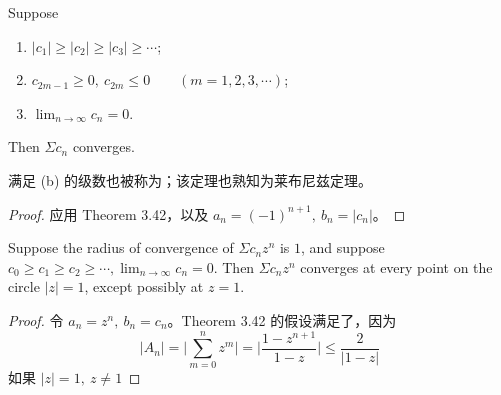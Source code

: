 \documentclass[../poma-notes.tex]{subfiles}
\begin{document}
\begin{theorem}
  Suppose
  \begin{enumerate}[label=(\alph*)]
    \item $|c_1| \ge |c_2| \ge |c_3| \ge \cdots$;
    \item $c_{2m-1} \ge 0,\ c_{2m} \le 0 \qquad (m=1,2,3,\cdots)$;
    \item $\lim_{n\to\infty} c_n = 0$.
  \end{enumerate}
  Then $\Sigma c_n$ converges.

  满足 (b) 的级数也被称为；该定理也熟知为莱布尼兹定理。
\end{theorem}

\begin{proof}
  应用 Theorem 3.42，以及 $a_n = (-1)^{n+1},\ b_n = |c_n|$。
\end{proof}

\begin{theorem} Suppose the radius of convergence of $\Sigma c_n z^n$ is $1$, and suppose $c_0\ge c_1\ge c_2\ge\cdots,
    \lim_{n\to\infty}c_n = 0$. Then $\Sigma c_n z^n$ converges at every point on the circle $|z|=1$,
  except possibly at $z=1$.
\end{theorem}

\begin{proof}
  令 $a_n = z^n,\ b_n = c_n$。Theorem 3.42 的假设满足了，因为
  \[
    |A_n| = \Biggl|\sum_{m=0}^{n}z^m\Biggr| = \Biggl|\frac{1-z^{n+1}}{1-z}\Biggr| \le \frac{2}{|1-z|}
  \]
  如果 $|z| = 1,\ z \ne 1$
\end{proof}
\end{document}
